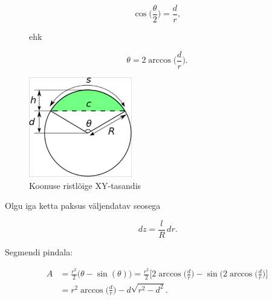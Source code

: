 \documentclass[a4paper]{article}
\begin{document}
\begin{figure}[H]
  \begin{minipage}{.35\textwidth}
\begin{equation}
\cos \bigg( \frac{\theta}{2} \bigg) = \frac{d}{r},
\end{equation}

 ehk

\begin{equation}
\theta = 2\arccos\bigg( \frac{d}{r} \bigg).
\end{equation}
  \end{minipage}%
  \begin{minipage}{.75\textwidth}
    \centering
    \includegraphics[width=0.4\textwidth]{koonus}
    \caption{Koonuse ristlõige XY-tasandis}
  \end{minipage}
\label{fig:koonus}
\end{figure}



\begin{flushleft}
Olgu iga ketta paksus väljendatav seosega
\end{flushleft}

\begin{equation}
\,dz = \frac{l}{R} \,dr.
\end{equation}

\begin{flushleft}
Segmendi pindala:
\end{flushleft}

\begin{equation} 
\begin{split}
A & = \frac{r^2}{2} \big(\theta - \sin(\theta)\big)  = \frac{r^2}{2} \bigg[ 2\arccos\bigg( \frac{d}{r} \bigg) - \sin\bigg( 2\arccos\bigg( \frac{d}{r} \bigg) \bigg] \\ & =  r^2 \arccos\bigg( \frac{d}{r} \bigg) - d \sqrt{r^2 - d^2}.
\end{split}
\end{equation}
\end{document}
